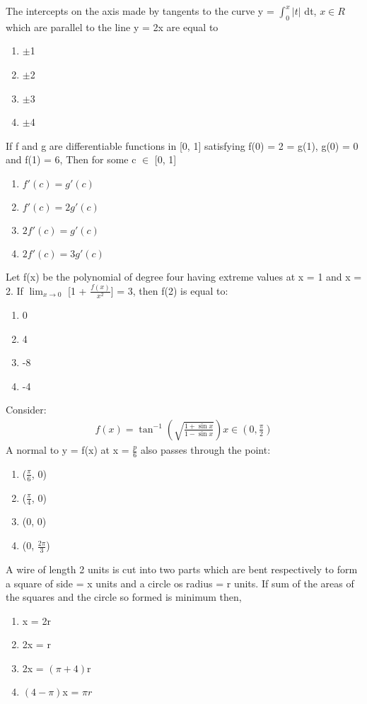 \item The intercepts on the axis made by tangents to the curve y = $\int_0^x |t|$ dt, $x \in R$ which are parallel to the line y = 2x are equal to 
\begin{enumerate}
\item $\pm$1
\item $\pm$2
\item $\pm$3
\item $\pm$4
\end{enumerate}

\item If f and g are differentiable functions in [0, 1] satisfying f(0) = 2 = g(1), g(0) = 0 and f(1) = 6, Then for some c $\in$ [0, 1]
\begin{enumerate}
\item $f'(c) = g'(c)$
\item $f'(c) = 2g'(c)$
\item $2f'(c) = g'(c)$
\item $2f'(c) = 3g'(c)$
\end{enumerate}

\item Let f(x) be the polynomial of degree four having extreme values at x = 1 and x = 2. If $\lim_{x \to 0}$
[1 + $\frac{f(x)}{x^2}$] = 3, then f(2) is equal to:
\begin{enumerate}
\item 0
\item 4
\item -8
\item -4
\end{enumerate}

\item Consider:
\begin{align*}
f(x) = \tan^{-1}(\sqrt{\frac{1 + \sin x}{1 - \sin x}}) x \in (0, \frac{\pi}{2})
\end{align*} 
A normal to y = f(x) at x = $\frac{p}{6}$ also passes through the point:
\begin{enumerate}
\item ($\frac{\pi}{6}$, 0)
\item ($\frac{\pi}{4}$, 0)
\item (0, 0)
\item (0, $\frac{2\pi}{3}$)
\end{enumerate}

\item A wire of length 2 units is cut into two parts which are bent respectively to form a square of side = x units and a circle os radius = r units. If sum of the areas of the squares and the circle so formed is minimum then,
\begin{enumerate}
\item x = 2r
\item 2x = r
\item 2x = $(\pi + 4)$r
\item $(4 - \pi)$x = $\pi r$
\end{enumerate}

